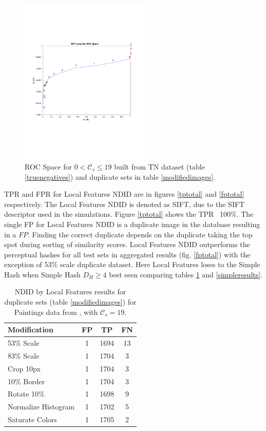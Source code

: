 \documentclass[english,12pt,a4paper,pdftex,elec,utf8]{aaltothesis}
\begin{document}
\begin{figure}[htb]
\begin{center}
\includegraphics[height=8cm]{figures/SIFTROCperCutoff}
\end{center}
\caption{ ROC Space for $0 < \mathcal{C}_{s} \leq 19$ built from TN dataset (table \ref{truenegatives}) and duplicate sets in table \ref{modifiedimages}.}
\label{figcutoffrocspace}
\end{figure}

TPR and FPR for Local Features NDID are in figures \ref{tptotal} and \ref{fptotal} respectively. The Local Features NDID is denoted as SIFT, due to the SIFT descriptor used in the simulations. Figure \ref{tptotal} shows the TPR ~100\%. The single FP for Local Features NDID is a duplicate image in the database resulting in a $FP$. Finding the correct duplicate depends on the duplicate taking the top spot during sorting of similarity scores. Local Features NDID outperforms the perceptual hashes for all test sets in aggregated results (fig. \ref{fptotal}) with the exception of 53\% scale duplicate dataset. Here Local Features loses to the Simple Hash when Simple Hash $D_H \geq 4 $ best seen comparing tables \ref{siftresults} and \ref{simpleresults}.

\begin{table}
\caption{ NDID by Local Features results for duplicate sets (table \ref{modifiedimages}) for Paintings data from \cite{Vedaldi2012}, with $\mathcal{C}_s = 19$.}
\label{siftresults}
\begin{center}
  \begin{tabular}{@{}lccc@{}}
    \toprule
    Modification & FP & TP & FN\\
    \hline
    53\% Scale & 1 & 1694 & 13 \\
    83\% Scale & 1 & 1704 & 3 \\
    Crop 10px  & 1 & 1704 & 3 \\
    10\% Border & 1 & 1704 & 3 \\
    Rotate 10\% & 1 & 1698 & 9\\
    Normalize Histogram & 1 & 1702 & 5\\
    Saturate Colors & 1 & 1705 & 2\\
    \bottomrule
\end{tabular}
\end{center}
\end{table}
\end{document}
